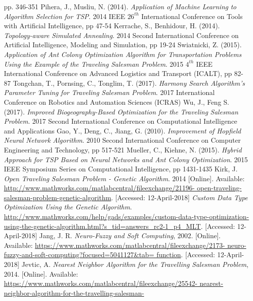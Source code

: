 \documentclass[twocolumn]{article}
\begin{document}
\begin{thebibliography}{999}
		pp. 346-351
		Pihera, J., Musliu, N. (2014).
		\emph{Application of Machine Learning to Algorithm Selection for TSP}. 2014 IEEE $26^{th}$ International Conference on Tools with Artificial Intelligence,
		pp 47-54
		Kerrache, S., Benhidour, H. (2014).
		\emph{Topology-aware Simulated Annealing}.
		2014 Second International Conference on Artificial Intelligence, Modeling and Simulation,
		pp 19-24
		Swiatnicki, Z. (2015).
		\emph{Application of Ant Colony Optimization Algorithm for Transportation Problems Using the Example of the Traveling Salesman Problem}.
		2015 $4^{th}$ IEEE International Conference on Advanced Logistics and Transport (ICALT),
		pp 82-87
		Tongchan, T., Pornsing, C., Tonglim, T. (2017).
		\emph{Harmony Search Algorithm's Parameter Tuning for Traveling Salesman Problem}.
		2017 International Conference on Robotics and Automation Sciences (ICRAS)
		Wu, J., Feng S. (2017).
		\emph{Improved Biogeography-Based Optimization for the Traveling Salesman Problem}.
		2017 Second International Conference on Computational Intelligence and Applications
		Gao, Y., Deng, C., Jiang, G. (2010).
		\emph{Improvement of Hopfield Neural Network Algorithm}.
		2010 Second International Conference on Computer Engineering and Technology,
		pp 517-521
		Mueller, C., Kiehne, N. (2015).
		\emph{Hybrid Approach for TSP Based on Neural Networks and Ant Colony Optimization}.
		2015 IEEE Symposium Series on Computational Intelligence,
		pp 1431-1435
		Kirk, J.
		\emph{Open Traveling Salesman Problem - Genetic Algorithm}. 2014 [Online].
		Available: \url{http://www.mathworks.com/matlabcentral/fileexchange/21196-
			open-traveling-salesman-problem-genetic-algorithm}. [Accessed: 12-April-2018]
		\emph{Custom Data Type Optimization Using the Genetic Algorithm}.
		\url{http://www.mathworks.com/help/gads/examples/custom-data-type-optimization-using-the-genetic-algorithm.html?s_tid=answers_rc2-1_p4_MLT}. [Accessed: 12-April-2018]
		Jang, J. R.
		\emph{Neuro-Fuzzy and Soft Computing}, 2002. [Online].
		Available: \url{https://www.mathworks.com/matlabcentral/fileexchange/2173-
			neuro-fuzzy-and-soft-computing?focused=5041127&tab=
			function}. [Accessed: 12-April-2018]
		Jevtic, A.
		\emph{Nearest Neighbor Algorithm for the Travelling Salesman Problem}, 2014. [Online]. Available: \url{https://www.mathworks.com/matlabcentral/fileexchange/25542-
			nearest-neighbor-algorithm-for-the-travelling-salesman-
}
\end{thebibliography}
\end{document}
